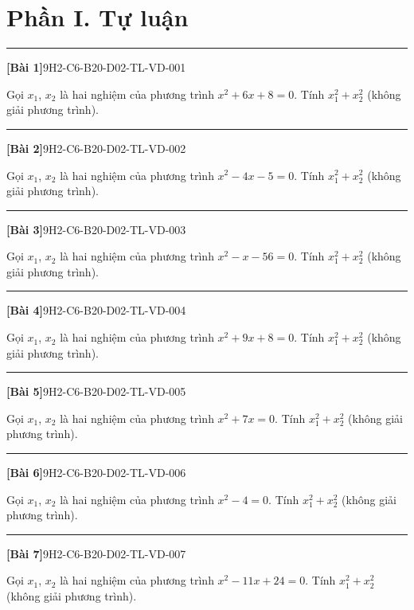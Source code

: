 \documentclass[12pt,a4paper]{article}
\newif\ifloigiai
\newenvironment{cauhoi}[2]{%
  \par\medskip\noindent\rule{\textwidth}{0.4pt}\par\nopagebreak
  \noindent\textbf{[#1]}\hfill{\scriptsize\ttfamily #2}\par\nopagebreak\smallskip}{\par}
\newcommand{\loigiai}[1]{\ifloigiai\par\smallskip\noindent\textit{Lời giải.} #1\par\fi}
\begin{document}
\section*{Phần I. Tự luận}
\begin{cauhoi}{Bài 1}{9H2-C6-B20-D02-TL-VD-001}
Gọi $x_1$, $x_2$ là hai nghiệm của phương trình $x^{2}+6x+8=0$. Tính $x_1^{2}+x_2^{2}$ (không giải phương trình).
\loigiai{Theo định lí Viète: $x_1+x_2=-6$, $x_1x_2=8$. Suy ra $x_1^{2}+x_2^{2}=(x_1+x_2)^{2}-2x_1x_2=-6^{2}-2\cdot(8)=20$.}
\end{cauhoi}
\begin{cauhoi}{Bài 2}{9H2-C6-B20-D02-TL-VD-002}
Gọi $x_1$, $x_2$ là hai nghiệm của phương trình $x^{2}-4x-5=0$. Tính $x_1^{2}+x_2^{2}$ (không giải phương trình).
\loigiai{Theo định lí Viète: $x_1+x_2=4$, $x_1x_2=-5$. Suy ra $x_1^{2}+x_2^{2}=(x_1+x_2)^{2}-2x_1x_2=4^{2}-2\cdot(-5)=26$.}
\end{cauhoi}
\begin{cauhoi}{Bài 3}{9H2-C6-B20-D02-TL-VD-003}
Gọi $x_1$, $x_2$ là hai nghiệm của phương trình $x^{2}-x-56=0$. Tính $x_1^{2}+x_2^{2}$ (không giải phương trình).
\loigiai{Theo định lí Viète: $x_1+x_2=1$, $x_1x_2=-56$. Suy ra $x_1^{2}+x_2^{2}=(x_1+x_2)^{2}-2x_1x_2=1^{2}-2\cdot(-56)=113$.}
\end{cauhoi}
\begin{cauhoi}{Bài 4}{9H2-C6-B20-D02-TL-VD-004}
Gọi $x_1$, $x_2$ là hai nghiệm của phương trình $x^{2}+9x+8=0$. Tính $x_1^{2}+x_2^{2}$ (không giải phương trình).
\loigiai{Theo định lí Viète: $x_1+x_2=-9$, $x_1x_2=8$. Suy ra $x_1^{2}+x_2^{2}=(x_1+x_2)^{2}-2x_1x_2=-9^{2}-2\cdot(8)=65$.}
\end{cauhoi}
\begin{cauhoi}{Bài 5}{9H2-C6-B20-D02-TL-VD-005}
Gọi $x_1$, $x_2$ là hai nghiệm của phương trình $x^{2}+7x=0$. Tính $x_1^{2}+x_2^{2}$ (không giải phương trình).
\loigiai{Theo định lí Viète: $x_1+x_2=-7$, $x_1x_2=0$. Suy ra $x_1^{2}+x_2^{2}=(x_1+x_2)^{2}-2x_1x_2=-7^{2}-2\cdot(0)=49$.}
\end{cauhoi}
\begin{cauhoi}{Bài 6}{9H2-C6-B20-D02-TL-VD-006}
Gọi $x_1$, $x_2$ là hai nghiệm của phương trình $x^{2}-4=0$. Tính $x_1^{2}+x_2^{2}$ (không giải phương trình).
\loigiai{Theo định lí Viète: $x_1+x_2=0$, $x_1x_2=-4$. Suy ra $x_1^{2}+x_2^{2}=(x_1+x_2)^{2}-2x_1x_2=0^{2}-2\cdot(-4)=8$.}
\end{cauhoi}
\begin{cauhoi}{Bài 7}{9H2-C6-B20-D02-TL-VD-007}
Gọi $x_1$, $x_2$ là hai nghiệm của phương trình $x^{2}-11x+24=0$. Tính $x_1^{2}+x_2^{2}$ (không giải phương trình).
\loigiai{Theo định lí Viète: $x_1+x_2=11$, $x_1x_2=24$. Suy ra $x_1^{2}+x_2^{2}=(x_1+x_2)^{2}-2x_1x_2=11^{2}-2\cdot(24)=73$.}
\end{cauhoi}
\end{document}
